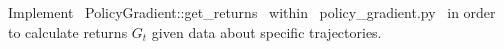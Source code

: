 \item {}

Implement ~PolicyGradient::get_returns~ within ~policy_gradient.py~ in order to calculate returns $G_{t}$ given data about specific trajectories.